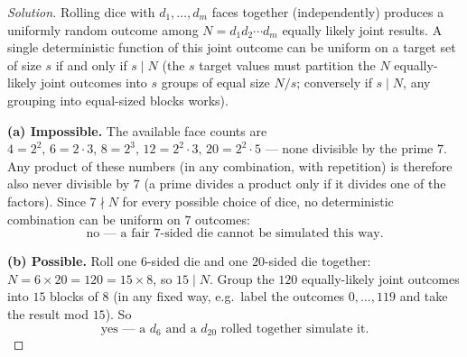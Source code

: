\documentclass[11pt]{article}
\theoremstyle{definition}
\begin{document}
\begin{proof}[Solution]
Rolling dice with $d_1,\dots,d_m$ faces together (independently) produces a uniformly random outcome among $N=d_1d_2\cdots d_m$ equally likely joint results. A single deterministic function of this joint outcome can be uniform on a target set of size $s$ if and only if $s\mid N$ (the $s$ target values must partition the $N$ equally-likely joint outcomes into $s$ groups of equal size $N/s$; conversely if $s\mid N$, any grouping into equal-sized blocks works).

\textbf{(a) Impossible.} The available face counts are $4=2^2,\,6=2\cdot3,\,8=2^3,\,12=2^2\cdot3,\,20=2^2\cdot5$ — none divisible by the prime $7$. Any product of these numbers (in any combination, with repetition) is therefore also never divisible by $7$ (a prime divides a product only if it divides one of the factors). Since $7\nmid N$ for every possible choice of dice, no deterministic combination can be uniform on $7$ outcomes:
\[
\boxed{\text{no — a fair } 7\text{-sided die cannot be simulated this way}}.
\]

\textbf{(b) Possible.} Roll one $6$-sided die and one $20$-sided die together: $N=6\times20=120=15\times8$, so $15\mid N$. Group the $120$ equally-likely joint outcomes into $15$ blocks of $8$ (in any fixed way, e.g.\ label the outcomes $0,\dots,119$ and take the result mod $15$). So
\[
\boxed{\text{yes — a } d_6 \text{ and a } d_{20} \text{ rolled together simulate it}}.
\]
\end{proof}
\end{document}
